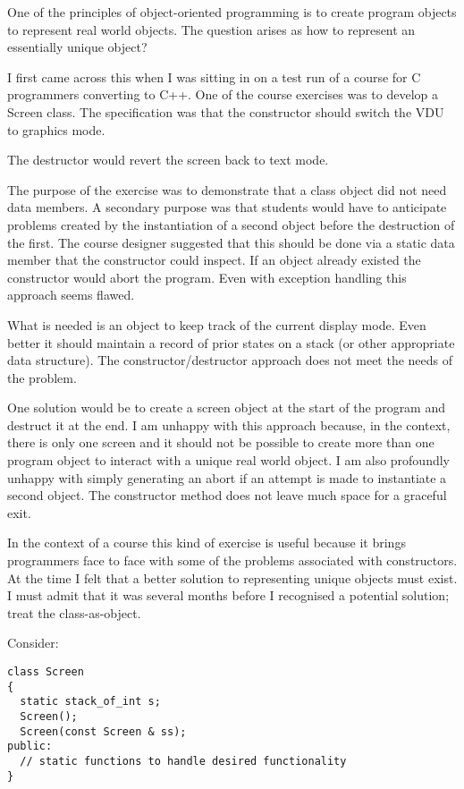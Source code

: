 \documentclass{book}
\begin{document}
One of the principles of object-oriented programming is to create program objects to represent real world objects. The question arises as how to represent an essentially unique object?

I first came across this when I was sitting in on a test run of a course for C programmers converting to C++. 
One of the course exercises was to develop a Screen class. The specification was that the constructor should switch the VDU to graphics mode.

The destructor would revert the screen back to text mode.

The purpose of the exercise was to demonstrate that a class object did not need data members. 
A secondary purpose was that students would have to anticipate problems created by the instantiation of a second object before the destruction of the first. 
The course designer suggested that this should be done via a static data member that the constructor could inspect. 
If an object already existed the constructor would abort the program. Even with exception handling this approach seems flawed.

What is needed is an object to keep track of the current display mode. Even better it should maintain a record of prior states on a stack (or other appropriate data structure). 
The constructor/destructor approach does not meet the needs of the problem.

One solution would be to create a screen object at the start of the program and destruct it at the end. 
I am unhappy with this approach because, in the context, there is only one screen and it should not be possible to create more than one program object to interact with a unique real world object. 
I am also profoundly unhappy with simply generating an abort if an attempt is made to instantiate a second object. The constructor method does not leave much space for a graceful exit.

In the context of a course this kind of exercise is useful because it brings programmers face to face with some of the problems associated with constructors. 
At the time I felt that a better solution to representing unique objects must exist. I must admit that it was several months before I recognised a potential solution; treat the class-as-object.

Consider:

\begin{lstlisting}
class Screen 
{
  static stack_of_int s;
  Screen();
  Screen(const Screen & ss);
public:
  // static functions to handle desired functionality
}
\end{lstlisting}
\end{document}
